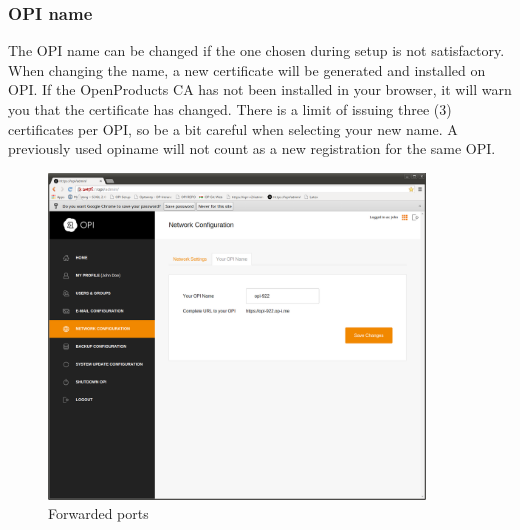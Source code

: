 \documentclass[12pt,a4paper,titlepage]{article}
\begin{document}
\subsubsection{OPI name}
The OPI name can be changed if the one chosen during setup is not satisfactory. When changing the name, a new certificate will be generated and installed on OPI. If the OpenProducts CA has not been installed in your browser, it will warn you that the certificate has changed.
There is a limit of issuing three (3) certificates per OPI, so be a bit careful when selecting your new name. A previously used opiname will not count as a new registration for the same OPI.
\begin{figure}[h]
\centering
\includegraphics[width=10cm]{./img/network-opiname}
\caption{Forwarded ports}
\end{figure}

\newpage
\end{document}
